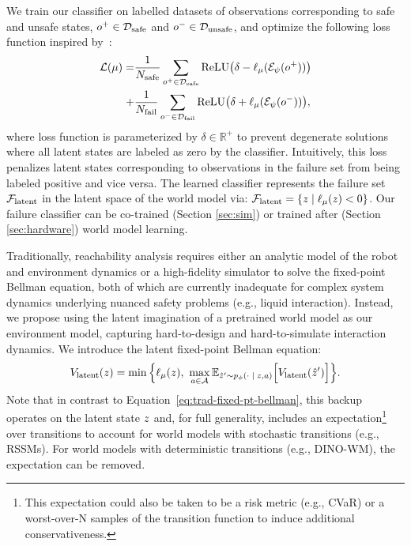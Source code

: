 We train our classifier on labelled datasets of observations corresponding to safe and unsafe states, $o^+ \in \mathcal{D}_{\text{safe}}$ and $o^- \in \mathcal{D}_{\text{unsafe}}$, and optimize the following loss function inspired by~\cite{yusequential}:
\begin{equation}
\begin{aligned}
     \mathcal{L}(\mu) = &\frac{1}{N_\text{safe}}\sum_{o^+ \in \mathcal{D}_{\text{safe}}} \text{ReLU}\big(\delta - \ell_\mu(\mathcal{E}_\psi(o^+))\big)\\ + &\frac{1}{N_\text{fail}}\sum_{o^- \in \mathcal{D}_\text{fail}} \text{ReLU}\big(\delta + \ell_\mu(\mathcal{E}_\psi(o^-))\big), 
     \label{eq:failure-classifier-loss}
\end{aligned}
\end{equation}
where loss function is parameterized by $\delta \in \mathbb{R}^+$ to prevent degenerate solutions where all latent states are labeled as zero by the classifier.
Intuitively, this loss penalizes latent states corresponding to observations in the failure set from being labeled positive and vice versa. 
The learned classifier represents the failure set $\mathcal{F}_\textrm{latent}$ in the latent space of the world model via: $\mathcal{F}_\textrm{latent} = \{z \mid \ell_\mu(z) < 0 \}$.  Our failure classifier can be co-trained (Section \ref{sec:sim}) or trained after (Section \ref{sec:hardware}) world model learning.

    
 Traditionally, reachability analysis requires either an analytic model of the robot and environment dynamics \cite{mitchell2004toolbox, bansal2021deepreach} or a high-fidelity simulator \cite{fisac2019bridging, hsu2023isaacs} to solve the fixed-point Bellman equation, both of which are currently inadequate for complex system dynamics underlying nuanced safety problems (e.g., liquid interaction). 
Instead, we propose using the latent imagination of a pretrained world model as our environment model, capturing  hard-to-design and hard-to-simulate interaction dynamics. 
We introduce the latent fixed-point Bellman equation: %
\begin{equation}
    V_{\textrm{latent}}(z) = \min \Big\{ \ell_\mu(z), ~ \max_{a \in \mathcal{A}} \mathbb{E}_{\hat{z}' \sim p_\phi(\cdot \; | \;z, a)} \Big[V_{\textrm{latent}}(\hat{z}') \Big]\Big\}.
    \label{eq:latent-fixed-pt-bellman}
\end{equation}
Note that in contrast to Equation~\ref{eq:trad-fixed-pt-bellman}, this backup operates on the latent state $z$ and, for full generality, includes an expectation\footnote{This expectation could also be taken to be a risk metric (e.g., CVaR) or a worst-over-N samples of the transition function to induce additional conservativeness.} over transitions to account for world models with stochastic transitions (e.g., RSSMs). For world models with deterministic transitions (e.g., DINO-WM), the expectation can be removed. 

